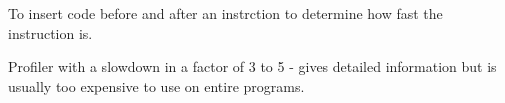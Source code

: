 \begin{definition}[Instrumentation]
    To insert code before and after an instrction to determine
    how fast the instruction is.
    
\end{definition}

\begin{definition}[Callgrind]
    Profiler with a slowdown in a factor of 3 to 5 - gives detailed information
    but is usually too expensive to use on entire programs.
\end{definition}

